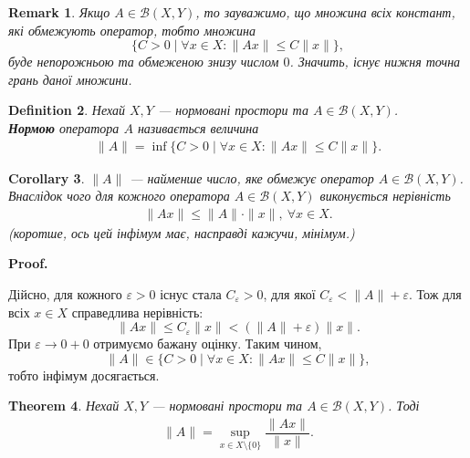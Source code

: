 \documentclass[a4paper, 10pt]{article}
\makeatletter
\theoremstyle{theoremdd}
\newtheorem{theorem}{Theorem}[subsection]
\theoremstyle{theoremdd}
\newtheorem{definition}[theorem]{Definition}
\theoremstyle{theoremdd}
\theoremstyle{theoremdd}
\theoremstyle{theoremdd}
\theoremstyle{theoremdd}
\newtheorem{remark}[theorem]{Remark}
\theoremstyle{theoremdd}
\theoremstyle{theoremdd}
\newtheorem{corollary}[theorem]{Corollary}
\renewenvironment{proof}[1][Proof.\\]{\par
\pushQED{\hfill \qed}%
\normalfont \topsep6\p@\@plus6\p@\relax
\trivlist
\item\relax
{\bfseries
#1\@addpunct{.}}\hspace\labelsep\ignorespaces
}{%
\popQED\endtrivlist\@endpefalse
}
\makeatother
\begin{document}
\begin{remark}
Якщо $A \in \mathcal{B}(X,Y)$, то зауважимо, що множина всіх констант, які обмежують оператор, тобто множина 
\[
\{C > 0 \mid \forall x \in X: \| Ax\| \leq C \|x\|\},
\]
буде непорожньою та обмеженою знизу числом $0$. Значить, існує нижня точна грань даної множини.
\end{remark}

\begin{definition}
Нехай $X,Y$ --- нормовані простори та $A \in \mathcal{B}(X,Y)$.\\
\textbf{Нормою} оператора $A$ називається величина
\begin{align*}
 \| A\| = \inf \{C > 0 \mid \forall x \in X: \| Ax \| \leq C \|x\|\}.
\end{align*}
\end{definition}

\begin{corollary}
$\|A\|$ --- найменше число, яке обмежує оператор $A \in \mathcal{B}(X,Y)$. Внаслідок чого для кожного оператора $A \in \mathcal{B}(X,Y)$ виконується нерівність
\begin{align*}
\| Ax \| \leq \|A\| \cdot \|x\|,\ \forall x \in X.
\end{align*}
(\textit{коротше, ось цей інфімум має, насправді кажучи, мінімум.})
\end{corollary}

\begin{proof}
Дійсно, для кожного $\varepsilon > 0$ існус стала $C_\varepsilon > 0$, для якої $C_\varepsilon < \|A\| + \varepsilon$. Тож для всіх $x \in X$ справедлива нерівність: 
\[
\|A x\| \leq C_\varepsilon \|x\| < (\| A \| + \varepsilon) \|x\|.
\]
При $\varepsilon \to 0+0$ отримуємо бажану оцінку. Таким чином, 
\[
\|A\| \in \{C > 0 \mid \forall x \in X: \|Ax\| \leq C \|x\|\},
\]
тобто інфімум досягається. 
\end{proof}

\begin{theorem}
Нехай $X,Y$ --- нормовані простори та $A \in \mathcal{B}(X,Y)$. Тоді 
\begin{align*}
\|A\| = \sup_{x \in X \setminus \{0\}} \dfrac{\| Ax\|}{\|x\|}.
\end{align*}
\end{theorem}
\end{document}
